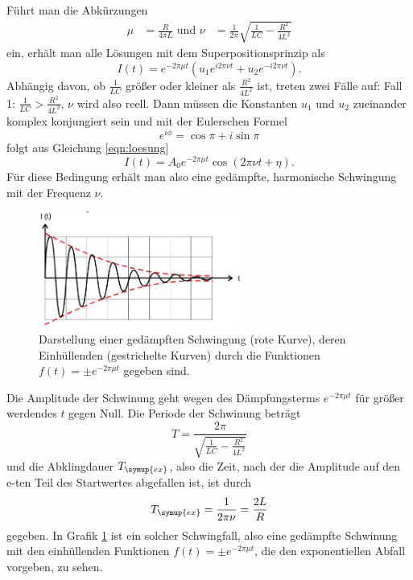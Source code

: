 Führt man die Abkürzungen
\begin{align*}
  \mu &= \frac{R}{4 \pi L} \text{ und }
  \nu &= \frac{1}{2\pi} \sqrt{\frac{1}{L C} - \frac{R^2}{4 L^2}}
\end{align*}
ein, erhält man alle Lösungen mit dem Superpositionsprinzip als
\begin{equation}
  I(t) = e^{-2 \pi \mu t} (u_1 e^{i 2 \pi \nu t} + u_2 e^{-i 2 \pi \nu t}).
  \label{eqn:loesung}
\end{equation}
Abhängig davon, ob $\frac{1}{L C}$ größer oder kleiner als $\frac{R^2}{4L^2}$ ist,
treten zwei Fälle auf: \newline
Fall 1: $\frac{1}{L C} > \frac{R^2}{4L^2}$, $\nu$ wird also reell. Dann müssen
die Konstanten $u_1$ und $u_2$ zueinander komplex konjungiert sein und mit der
Eulerschen Formel
\begin{equation}
  e^{i\phi} = \cos{\pi} + i \sin{\pi}
  \label{eqn:euler}
\end{equation}
folgt aus Gleichung \eqref{eqn:loesung}
\begin{equation}
  I(t) = A_0 e^{-2\pi\mu t}\cos{(2\pi\nu t + \eta)}.
  \label{eqn:gedaempfte_schwingung}
\end{equation}
Für diese Bedingung erhält man also eine gedämpfte, harmonische Schwingung mit der
Frequenz $\nu$.
\begin{figure}
  \centering
  \includegraphics[width=0.6\textwidth]{gedaempfte_schwingung.png}
  \caption{Darstellung einer gedämpften Schwingung (rote Kurve), deren Einhüllenden
  (gestrichelte Kurven) durch die Funktionen $f(t)=\pm e^{-2\pi\mu t}$ gegeben
  sind\cite{sample}.}
  \label{fig:gedaempfte_schwingung}
\end{figure}
Die Amplitude der Schwinung geht wegen des Dämpfungsterms
$e^{-2\pi\mu t}$ für größer werdendes $t$ gegen Null. Die Periode der Schwinung
beträgt
\begin{equation}
  T = \frac{2\pi}{\sqrt{\frac{1}{L C}-\frac{R^2}{4 L^2}}}
  \label{eqn:periode}
\end{equation}
und die Abklingdauer $T_\symup{ex}$, also die Zeit, nach der die Amplitude auf den
e-ten Teil des Startwertes abgefallen ist, ist durch
\begin{equation}
  T_\symup{ex} = \frac{1}{2\pi\nu} = \frac{2L}{R}
  \label{eqn:abklingzeit}
\end{equation}
gegeben. In Grafik \ref{fig:gedaempfte_schwingung} ist ein solcher Schwingfall,
also eine gedämpfte Schwinung mit den einhüllenden Funktionen $f(t)=\pm e^{-2\pi\mu t}$,
die den exponentiellen Abfall vorgeben, zu sehen.


